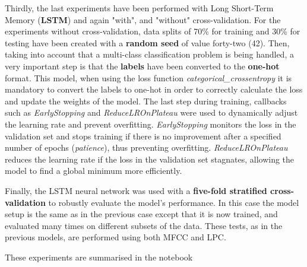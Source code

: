 Thirdly, the last experiments have been performed with Long Short-Term Memory (\textbf{LSTM}) and again "with", and "without" cross-validation. For the experiments without cross-validation, data splits of 70\% for training and 30\% for testing have been created with a \textbf{random seed} of value forty-two (42). Then, taking into account that a multi-class classification problem is being handled, a very important step is that the \textbf{labels} have been converted to the \textbf{one-hot} format. This model, when using the loss function \textit{categorical\_crossentropy} it is mandatory to convert the labels to one-hot in order to correctly calculate the loss and update the weights of the model. The last step during training, callbacks such as \textit{EarlyStopping} and \textit{ReduceLROnPlateau} were used to dynamically adjust the learning rate and prevent overfitting. \textit{EarlyStopping} monitors the loss in the validation set and stops training if there is no improvement after a specified number of epochs (\textit{patience}), thus preventing overfitting. \textit{ReduceLROnPlateau} reduces the learning rate if the loss in the validation set stagnates, allowing the model to find a global minimum more efficiently.

Finally, the LSTM neural network was used with a \textbf{five-fold stratified cross-validation} to robustly evaluate the model's performance. In this case the model setup is the same as in the previous case except that it is now trained, and evaluated many times on different subsets of the data. These tests, as in the previous models, are performed using both MFCC and LPC.

These experiments are summarised in the notebook 

